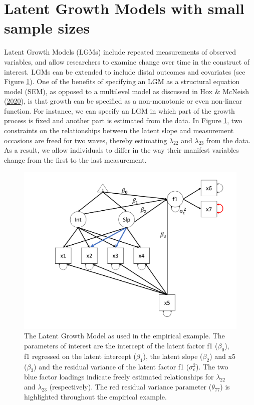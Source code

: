 \documentclass[openright,titlepage,12pt,a4paper]{book}
\begin{document}
\hypertarget{latent-growth-models-with-small-sample-sizes}{%
\section{Latent Growth Models with small sample sizes}\label{latent-growth-models-with-small-sample-sizes}}

Latent Growth Models (LGMs) include repeated measurements of observed variables, and allow researchers to examine change over time in the construct of interest. LGMs can be extended to include distal outcomes and covariates (see Figure \ref{fig:ch05fig1}). One of the benefits of specifying an LGM as a structural equation model (SEM), as opposed to a multilevel model as discussed in Hox \& McNeish (\protect\hyperlink{ref-hox_small_2020}{2020}), is that growth can be specified as a non-monotonic or even non-linear function. For instance, we can specify an LGM in which part of the growth process is fixed and another part is estimated from the data. In Figure \ref{fig:ch05fig1}, two constraints on the relationships between the latent slope and measurement occasions are freed for two waves, thereby estimating \(\lambda_{22}\) and \(\lambda_{23}\) from the data. As a result, we allow individuals to differ in the way their manifest variables change from the first to the last measurement.

\begin{figure}

{\centering \includegraphics[width=0.8\linewidth]{figures/chapter_5/Figure1} 

}

\caption{The Latent Growth Model as used in the empirical example. The parameters of interest are the intercept of the latent factor f1 ($\beta_0$), f1 regressed on the latent intercept ($\beta_1$), the latent slope ($\beta_2$) and x5 ($\beta_3$) and the residual variance of the latent factor f1 ($\sigma_\epsilon^2$). The two blue factor loadings indicate freely estimated relationships for $\lambda_{22}$ and $\lambda_{23}$ (respectively). The red residual variance parameter ($\theta_{77}$) is highlighted throughout the empirical example. }\label{fig:ch05fig1}
\end{figure}
\end{document}
